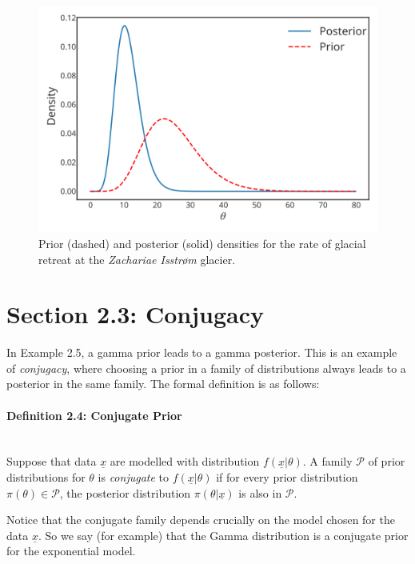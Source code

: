 {\begin{figure}[h]

\includegraphics{images/glacier_posterior.svg}
\caption{Prior (dashed) and posterior (solid) densities for the rate of glacial retreat at the \textit{Zachariae Isstr\o m} glacier.}

\label{fig:glacierposterior}
\end{figure}}


\section{Section 2.3: Conjugacy}

In Example 2.5, a gamma prior leads to a gamma posterior.
This is an example of {\it conjugacy}, where choosing a prior in a family of distributions
always leads to a posterior in the same family.
The formal definition is as follows:

\paragraph{Definition 2.4: Conjugate Prior}{~\\
Suppose that data $\underline{x}$ are modelled with distribution
$f(\underline{x}|\theta)$. A family $\mathcal{P}$ of prior distributions for
$\theta$ is \emph{conjugate} to $f(\underline{x}|\theta)$ if
for every prior distribution $\pi(\theta)\in\mathcal{P}$, the
posterior distribution $\pi(\theta|\underline{x})$ is also in $\mathcal{P}$.}

Notice that the conjugate family depends crucially on the model chosen
for the data $\underline{x}$. So we say (for example) that the Gamma distribution
is a conjugate prior for the exponential model.

